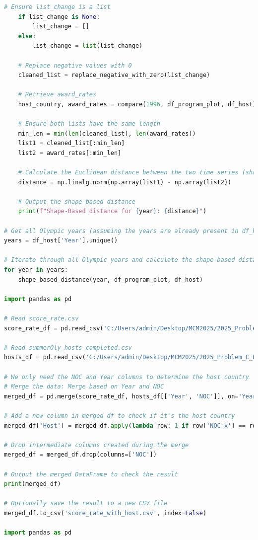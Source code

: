 \documentclass[12pt]{article}
\begin{document}
\begin{lstlisting}[language=Python, style=mystyle, caption=data\_analyze.ipynb]
    # Ensure list_change is a list
    if list_change is None:
        list_change = []
    else:
        list_change = list(list_change)

    # Replace negative values with 0
    cleaned_list = replace_negative_with_zero(list_change)

    # Retrieve award_rates
    host_country, award_rates = compare(1996, df_program_plot, df_host)

    # Ensure both lists have the same length
    min_len = min(len(cleaned_list), len(award_rates))
    list1 = cleaned_list[:min_len]
    list2 = award_rates[:min_len]

    # Calculate the Euclidean distance between the two time series (shape-based distance)
    distance = np.linalg.norm(np.array(list1) - np.array(list2))

    # Output the shape-based distance
    print(f"Shape-Based distance for {year}: {distance}")

# Get all Olympic years (assuming the years are already present in df_host)
years = df_host['Year'].unique()

# Iterate through all Olympic years and calculate the shape-based distance
for year in years:
    shape_based_distance(year, df_program_plot, df_host)

import pandas as pd

# Read score_rate.csv
score_rate_df = pd.read_csv('C:/Users/admin/Desktop/MCM2025/2025_Problem_C_Data/score_rate.csv')

# Read summerOly_hosts_completed.csv
hosts_df = pd.read_csv('C:/Users/admin/Desktop/MCM2025/2025_Problem_C_Data/summerOly_hosts_completed.csv')

# We only need the NOC and Year columns to determine the host country
# Merge the data: Merge based on Year and NOC
merged_df = pd.merge(score_rate_df, hosts_df[['Year', 'NOC']], on='Year', how='left')

# Add a new column in merged_df to check if it's the host country
merged_df['Host'] = merged_df.apply(lambda row: 1 if row['NOC_x'] == row['NOC'] else 0, axis=1)

# Drop intermediate columns created during the merge
merged_df = merged_df.drop(columns=['NOC'])

# Output the merged DataFrame to check the result
print(merged_df)

# Optionally save the result to a new CSV file
merged_df.to_csv('score_rate_with_host.csv', index=False)

import pandas as pd


\end{lstlisting}
\end{document}

